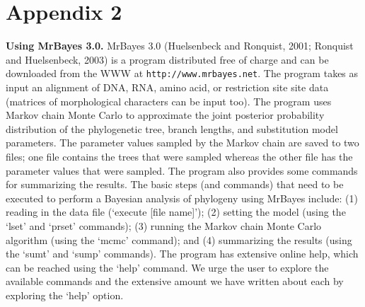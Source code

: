 \documentclass{svmult}
\begin{document}
\newpage


\section*{Appendix 2}

{\bf Using MrBayes 3.0.} MrBayes 3.0 (Huelsenbeck and Ronquist, 2001; Ronquist and Huelsenbeck, 2003) is a program distributed free
of charge and can be downloaded from the WWW at {\tt http://www.mrbayes.net}. The program takes as input an alignment of DNA,
RNA, amino acid, or restriction site site data (matrices of morphological characters can be input too). The program uses Markov chain
Monte Carlo to approximate the joint posterior probability distribution of the phylogenetic tree, branch lengths, and substitution model
parameters. The parameter values sampled by the Markov chain are saved to two files; one file contains the trees that were sampled
whereas the other file has the parameter values that were sampled. The program also provides some commands for summarizing the
results. The basic steps (and commands) that need to be executed to perform a Bayesian analysis of phylogeny using MrBayes include:
(1) reading in the data file (`execute [file name]'); (2) setting the model (using the `lset' and `prset' commands); (3) running the 
Markov chain Monte Carlo algorithm (using the `mcmc' command); and (4) summarizing the results (using the `sumt' and `sump' commands).
The program has extensive online help, which can be reached using the `help' command. We urge the user to explore the available commands
and the extensive amount we have written about each by exploring the `help' option.

\bigskip
\end{document}
